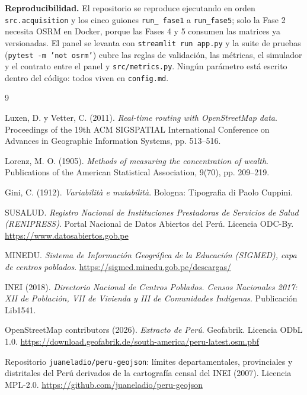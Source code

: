 \documentclass[11pt,a4paper]{article}
\begin{document}
\textbf{Reproducibilidad.} El repositorio se reproduce ejecutando en orden
\texttt{src.acquisition} y los cinco guiones \texttt{run\_\allowbreak
fase1} a \texttt{run\_\allowbreak fase5}; solo la Fase 2 necesita OSRM en
Docker, porque las Fases 4 y 5 consumen las matrices ya versionadas. El panel
se levanta con \texttt{streamlit run app.py} y la suite de pruebas
(\texttt{pytest -m 'not osrm'}) cubre las reglas de validación, las métricas,
el simulador y el contrato entre el panel y \texttt{src/metrics.py}. Ningún
parámetro está escrito dentro del código: todos viven en \texttt{config.md}.

\begin{thebibliography}{9}
\footnotesize

Luxen, D. y Vetter, C. (2011).
\emph{Real-time routing with OpenStreetMap data}.
Proceedings of the 19th ACM SIGSPATIAL International Conference on Advances in
Geographic Information Systems, pp. 513--516.

Lorenz, M. O. (1905).
\emph{Methods of measuring the concentration of wealth}.
Publications of the American Statistical Association, 9(70), pp. 209--219.

Gini, C. (1912). \emph{Variabilità e mutabilità}. Bologna: Tipografia di Paolo
Cuppini.

SUSALUD. \emph{Registro Nacional de Instituciones Prestadoras de Servicios de
Salud (RENIPRESS)}. Portal Nacional de Datos Abiertos del Perú. Licencia
ODC-By. \url{https://www.datosabiertos.gob.pe}

MINEDU. \emph{Sistema de Información Geográfica de la Educación (SIGMED), capa
de centros poblados}. \url{https://sigmed.minedu.gob.pe/descargas/}

INEI (2018). \emph{Directorio Nacional de Centros Poblados. Censos Nacionales
2017: XII de Población, VII de Vivienda y III de Comunidades Indígenas}.
Publicación Lib1541.

OpenStreetMap contributors (2026). \emph{Extracto de Perú}. Geofabrik.
Licencia ODbL 1.0.
\url{https://download.geofabrik.de/south-america/peru-latest.osm.pbf}

Repositorio \texttt{juaneladio/\allowbreak peru-geojson}: límites
departamentales, provinciales y distritales del Perú derivados de la
cartografía censal del INEI (2007). Licencia MPL-2.0.
\url{https://github.com/juaneladio/peru-geojson}

\end{thebibliography}
\end{document}
